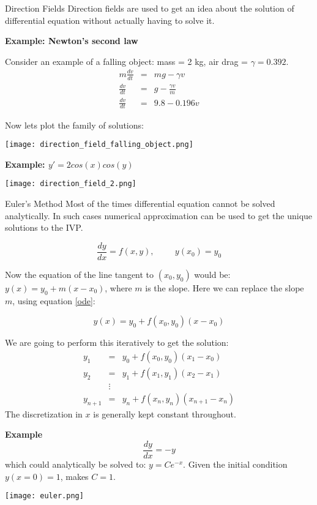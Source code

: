 \documentclass[11pt,titlepage,fleqn]{article}
\begin{document}
\begin{subsection}{Direction Fields}
Direction fields are used to get an idea about the solution of differential equation without actually having to solve it.

{\bf Example: Newton's second law}

Consider an example of a falling object: mass = 2 kg, air drag = $\gamma = 0.392$.
\begin{eqnarray*}
m \frac{dv}{dt} &=& mg - \gamma v \\
\frac{dv}{dt} &=& g - \frac{\gamma v}{m}\\
\frac{dv}{dt} &=& 9.8 - 0.196 v
\end{eqnarray*}

Now lets plot the family of solutions:

\texttt{[image: direction\_field\_falling\_object.png]}

{\bf Example: $y' = 2 cos(x
) cos(y)$}

\texttt{[image: direction\_field\_2.png]}

\end{subsection}

\begin{section}{Euler's Method}
Most of the times differential equation cannot be solved analytically. In such cases numerical approximation can be used to get the unique solutions to the IVP.

\begin{equation}
\frac{dy}{dx} = f(x,y), \hspace{1cm} y(x_0) = y_0   \label{ode}
\end{equation}

Now the equation of the line tangent to $(x_0,y_0)$ would be: $y(x) = y_0 + m(x - x_0)$, where $m$ is the slope. Here we can replace the slope $m$, using equation \ref{ode}:

\begin{equation*}
y(x) = y_0 + f(x_0,y_0)(x - x_0)
\end{equation*}

We are going to perform this iteratively to get the solution:
\begin{eqnarray*}
y_1 &=& y_0 + f(x_0,y_0)(x_1 - x_0) \\
y_2 &=& y_1 + f(x_1,y_1)(x_2 - x_1) \\
&\vdots&\\
y_{n+1} &=& y_n + f(x_n,y_n)(x_{n+1} - x_n)
\end{eqnarray*}
The discretization in $x$ is generally kept constant throughout.

{\bf Example}
\begin{equation*}
\frac{dy}{dx} = -y
\end{equation*}
which could analytically be solved to: $y = C e^{-x}$. Given the initial condition $y(x=0) = 1$, makes $C=1$.

\texttt{[image: euler.png]}


\end{section}
\end{document}

